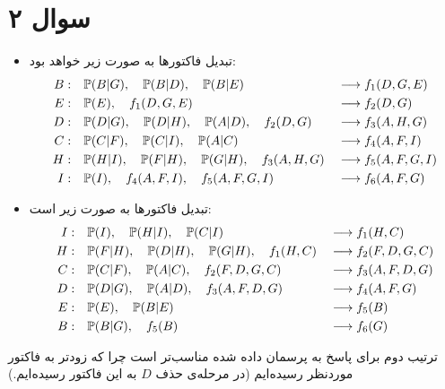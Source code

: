 \documentclass[a4paper, 12pt]{article}
\begin{document}
\section*{سوال ۲}
\begin{itemize}
	\item
	تبدیل فاکتورها به صورت زیر خواهد بود:
	\[
	\begin{aligned}
		B:\quad&{\mathbb P}(B|G),\quad {\mathbb P}(B|D),\quad {\mathbb P}(B|E) && \longrightarrow  f_1(D,G,E) \\
		E:\quad&{\mathbb P}(E), \quad f_1(D,G,E) && \longrightarrow f_2(D,G) \\
		D:\quad&{\mathbb P}(D|G), \quad {\mathbb P}(D|H), \quad {\mathbb P}(A|D), \quad f_2(D,G) && \longrightarrow f_3(A,H,G) \\
		C:\quad&{\mathbb P}(C|F), \quad {\mathbb P}(C|I), \quad {\mathbb P}(A|C) && \longrightarrow f_4(A,F,I) \\
		H:\quad&{\mathbb P}(H|I), \quad {\mathbb P}(F|H), \quad {\mathbb P}(G|H), \quad f_3(A,H,G) && \longrightarrow f_5(A,F,G,I) \\
		I:\quad&{\mathbb P}(I), \quad f_4(A,F,I), \quad f_5(A,F,G,I) && \longrightarrow f_6(A,F,G)		
	\end{aligned}
	\]
	\item
	تبدیل فاکتورها به صورت زیر است:
	\[
	\begin{aligned}
		I:\quad&{\mathbb P}(I),\quad{\mathbb P}(H|I),\quad{\mathbb P}(C|I) &&\longrightarrow f_1(H,C) \\
		H:\quad&{\mathbb P}(F|H),\quad{\mathbb P}(D|H),\quad{\mathbb P}(G|H),\quad f_1(H,C) &&\longrightarrow f_2(F,D,G,C) \\
		C:\quad&{\mathbb P}(C|F),\quad{\mathbb P}(A|C),\quad f_2(F,D,G,C) &&\longrightarrow f_3(A,F,D,G) \\
		D:\quad&{\mathbb P}(D|G),\quad{\mathbb P}(A|D),\quad f_3(A,F,D,G) &&\longrightarrow f_4(A,F,G) \\
		E:\quad&{\mathbb P}(E),\quad{\mathbb P}(B|E) &&\longrightarrow f_5(B) \\
		B:\quad&{\mathbb P}(B|G),\quad f_5(B) &&\longrightarrow f_6(G)
	\end{aligned}
	\]
\end{itemize}
ترتیب دوم برای پاسخ به پرسمان داده شده مناسب‌تر است چرا که زودتر به فاکتور موردنظر رسیده‌ایم (در مرحله‌ی حذف $D$ به این فاکتور رسیده‌ایم.)
\end{document}
